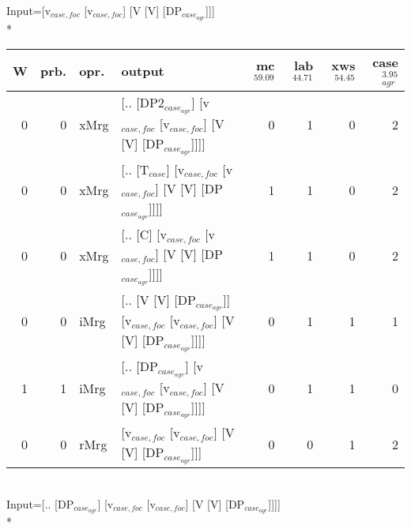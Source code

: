 \begingroup\scriptsize Input=[v$_{case,foc}$ [v$_{case,foc}$] [V [V] [DP$_{case_{agr}}$]]]\\*
\begin{tabularx}{\linewidth}{rrlXrrrr}
\hline
   W &   prb. & opr.   & output                                                                     &   mc$^{59.09}$ &   lab$^{44.71}$ &   xws$^{54.45}$ &   case$_{agr}^{3.95}$ \\
\hline
   0 &   0 & xMrg & [.. [DP2$_{case_{agr}}$] [v$_{case,foc}$ [v$_{case,foc}$] [V [V] [DP$_{case_{agr}}$]]]]        &            0 &             1 &             0 &                  2 \\
   0 &   0 & xMrg & [.. [T$_{case}$] [v$_{case,foc}$ [v$_{case,foc}$] [V [V] [DP$_{case_{agr}}$]]]]              &            1 &             1 &             0 &                  2 \\
   0 &   0 & xMrg & [.. [C] [v$_{case,foc}$ [v$_{case,foc}$] [V [V] [DP$_{case_{agr}}$]]]]                   &            1 &             1 &             0 &                  2 \\
   0 &   0 & iMrg & [.. [V [V] [DP$_{case_{agr}}$]] [v$_{case,foc}$ [v$_{case,foc}$] [V [V] [DP$_{case_{agr}}$]]]] &            0 &             1 &             1 &                  1 \\
   1 &   1 & iMrg & [.. [DP$_{case_{agr}}$] [v$_{case,foc}$ [v$_{case,foc}$] [V [V] [DP$_{case_{agr}}$]]]]         &            0 &             1 &             1 &                  0 \\
   0 &   0 & rMrg & [v$_{case,foc}$ [v$_{case,foc}$] [V [V] [DP$_{case_{agr}}$]]]                            &            0 &             0 &             1 &                  2 \\
\hline
\end{tabularx}\endgroup\\
\begingroup\scriptsize Input=[.. [DP$_{case_{agr}}$] [v$_{case,foc}$ [v$_{case,foc}$] [V [V] [DP$_{case_{agr}}$]]]]\\*
